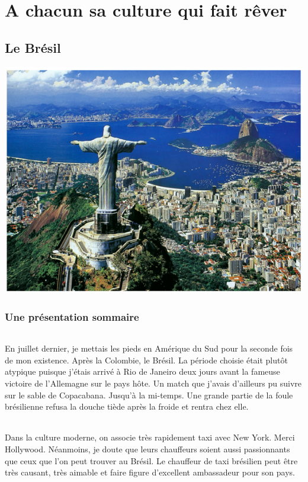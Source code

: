 \part{A chacun sa culture qui fait rêver}
\chapter{Le Brésil}

\begin{center}
\includegraphics[scale=0.5]{bresil1.png}
\end{center}

\section{Une présentation sommaire}
\paragraph{}
En	juillet	dernier,	je	mettais	les	pieds	en	Amérique	du	Sud	pour	la	seconde	fois	de mon	existence.	Après	la	Colombie,	le	Brésil.	La	période choisie	était	plutôt	atypique puisque	j’étais	arrivé	à	Rio	de	Janeiro	deux jours	avant	la	fameuse	victoire	de l’Allemagne	sur	le	pays	hôte.	Un match	que	j’avais	d’ailleurs	pu	suivre	sur	le	sable	de	Copacabana. Jusqu’à	la	mi-temps.	Une grande	partie	de	la	foule	brésilienne	refusa	la	douche	tiède	après	la	froide	et	rentra	chez	elle.
\paragraph{}
Dans	la	culture	moderne,	on	associe	très	rapidement	taxi	avec	New	York.	Merci Hollywood.	Néanmoins,	je	doute	que	leurs	chauffeurs	soient	aussi passionnants	que	ceux	que	l’on	peut	trouver	au	Brésil.	Le	chauffeur	de taxi	brésilien	peut	être	très	causant,	très	aimable	et	faire	figure d’excellent	ambassadeur	pour	son	pays.

